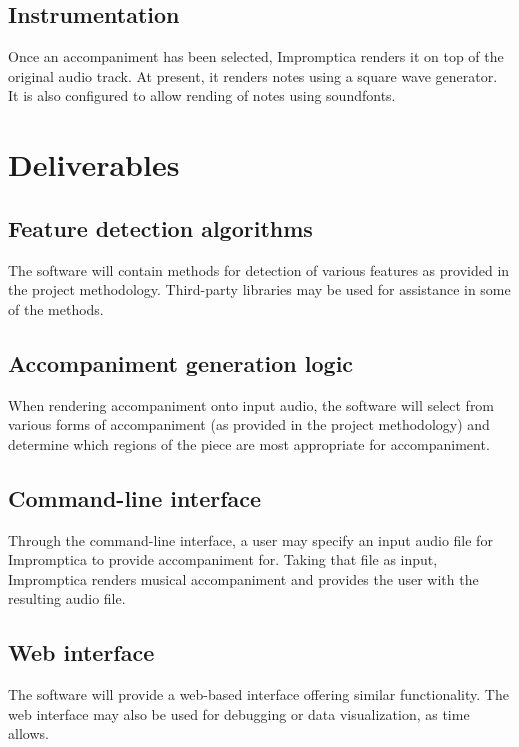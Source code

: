 \documentclass[11pt,conference,letterpaper]{IEEEtran}
\begin{document}
\subsection{Instrumentation}

Once an accompaniment has been selected, Impromptica renders it on top of the original audio track. At present, it renders notes using a square wave generator. It is also configured to allow rending of notes using soundfonts.

\section{Deliverables}

\subsection{Feature detection algorithms}

The software will contain methods for detection of various features as provided in the project methodology. Third-party libraries may be used for assistance in some of the methods.

\subsection{Accompaniment generation logic}

When rendering accompaniment onto input audio, the software will select from various forms of accompaniment (as provided in the project methodology) and determine which regions of the piece are most appropriate for accompaniment.

\subsection{Command-line interface}

Through the command-line interface, a user may specify an input audio file for Impromptica to provide accompaniment for. Taking that file as input, Impromptica renders musical accompaniment and provides the user with the resulting audio file.

\subsection{Web interface}

The software will provide a web-based interface offering similar functionality. The web interface may also be used for debugging or data visualization, as time allows.
\end{document}
